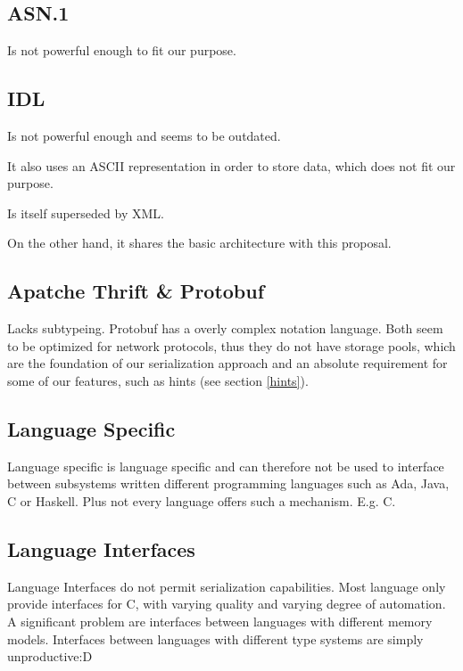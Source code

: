 \documentclass[a4paper,10pt]{article}
\begin{document}
\subsection*{ASN.1}

Is not powerful enough to fit our purpose.

\subsection*{IDL}

 Is not powerful enough and seems to be outdated.

It also uses an ASCII representation in order to store data, which does not fit our purpose.

Is itself superseded by XML.

On the other hand, it shares the basic architecture with this proposal.


\subsection*{Apatche Thrift \& Protobuf}

Lacks subtypeing. Protobuf has a overly complex notation language. Both seem to be optimized for network protocols, thus they do not have storage pools, which are the foundation of our serialization approach and an absolute requirement for some of our features, such as hints (see section \ref{hints}).


\subsection*{Language Specific}

Language specific is language specific and can therefore not be used to interface between subsystems written different programming languages such as Ada, Java, C or Haskell. Plus not every language offers such a mechanism. E.g. C.


\subsection*{Language Interfaces}
Language Interfaces do not permit serialization capabilities. Most language only provide interfaces for C, with varying quality and varying degree of automation. A significant problem are interfaces between languages with different memory models.
Interfaces between languages with different type systems are simply unproductive:D
\end{document}
